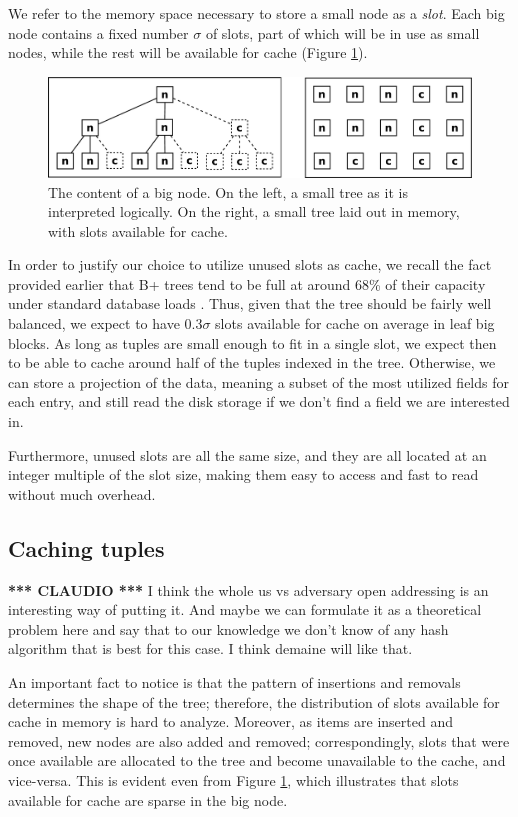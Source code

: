 \documentclass{article}
\newcommand{\claudio}{\textcolor{Cerulean}{\textbf{*** CLAUDIO ***} }}
\begin{document}
We refer to the memory space necessary to store a small node as a \textit{slot}.
Each big node contains a fixed number $\sigma$ of slots, part of which will be in use
as small nodes, while the rest will be available for cache (Figure \ref{fig:inner_block}).
\begin{figure}[h]
\begin{center}
\includegraphics[width=350pt]{inner_block}
\end{center}
\caption{
The content of a big node.
On the left, a small tree as it is interpreted logically.
On the right, a small tree laid out in memory, with slots available for cache.
}
\label{fig:inner_block}
\end{figure}

In order to justify our choice to utilize unused slots as cache,
we recall the fact provided earlier that
B+ trees tend to be full at around 68\% of their capacity under standard database loads \citep{Wu:2011}.
Thus, given that the tree should be fairly well balanced,
we expect to have $0.3 \sigma$ slots available for cache on average in leaf big blocks.
As long as tuples are small enough to fit in a single slot,
we expect then to be able to cache around half of the tuples indexed in the tree.
Otherwise, we can store a projection of the data, meaning a subset of the most utilized fields for each entry,
and still read the disk storage if we don't find a field we are interested in.

Furthermore, unused slots are all the same size, and they are all located at an integer multiple
of the slot size, making them easy to access and fast to read without much overhead.


\subsection{Caching tuples}
\claudio 
I think the whole us vs adversary open addressing is an interesting way of putting it. And maybe we can formulate it as a theoretical problem here and say that to our knowledge we don't know of any hash algorithm that is best for this case. I think demaine will like that.

An important fact to notice is that the pattern of insertions and removals determines the shape of the tree;
therefore, the distribution of slots available for cache in memory is hard to analyze.
Moreover, as items are inserted and removed, new nodes are also added and removed;
correspondingly, slots that were once available are allocated to the
tree and become unavailable to the cache, and vice-versa.
This is evident even from Figure \ref{fig:inner_block}, which illustrates that
slots available for cache are sparse in the big node.
\end{document}
